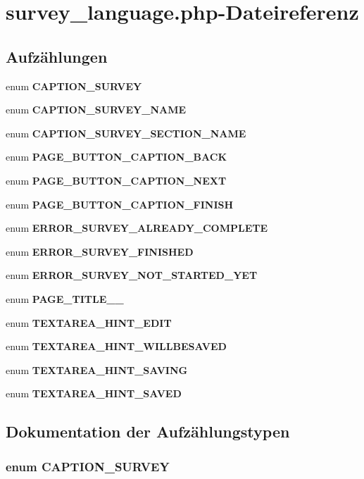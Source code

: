 \section{survey\_\-language.php-Dateireferenz}
\label{error_2language_2dei_2survey__language_8php}
\subsection*{Aufzählungen}
\begin{CompactItemize}
\item 
enum {\bf CAPTION\_\-SURVEY} 
\item 
enum {\bf CAPTION\_\-SURVEY\_\-NAME} 
\item 
enum {\bf CAPTION\_\-SURVEY\_\-SECTION\_\-NAME} 
\item 
enum {\bf PAGE\_\-BUTTON\_\-CAPTION\_\-BACK} 
\item 
enum {\bf PAGE\_\-BUTTON\_\-CAPTION\_\-NEXT} 
\item 
enum {\bf PAGE\_\-BUTTON\_\-CAPTION\_\-FINISH} 
\item 
enum {\bf ERROR\_\-SURVEY\_\-ALREADY\_\-COMPLETE} 
\item 
enum {\bf ERROR\_\-SURVEY\_\-FINISHED} 
\item 
enum {\bf ERROR\_\-SURVEY\_\-NOT\_\-STARTED\_\-YET} 
\item 
enum {\bf PAGE\_\-TITLE\_\_\-} 
\item 
enum {\bf TEXTAREA\_\-HINT\_\-EDIT} 
\item 
enum {\bf TEXTAREA\_\-HINT\_\-WILLBESAVED} 
\item 
enum {\bf TEXTAREA\_\-HINT\_\-SAVING} 
\item 
enum {\bf TEXTAREA\_\-HINT\_\-SAVED} 
\end{CompactItemize}


\subsection{Dokumentation der Aufzählungstypen}
\subsubsection{\setlength{\rightskip}{0pt plus 5cm}enum {\bf CAPTION\_\-SURVEY}}\label{error_2language_2dei_2survey__language_8php_444e06cfef50e744e19a0d93a8e89c08}




